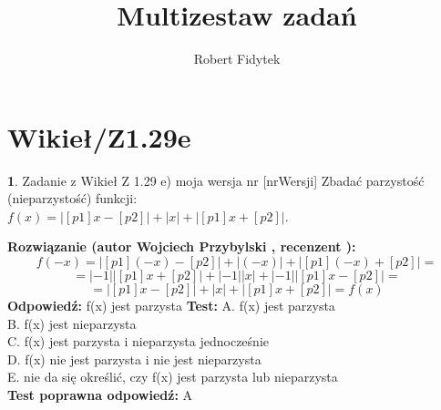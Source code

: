 \documentclass[12pt, a4paper]{article}
\title{Multizestaw zadań}
\author{Robert Fidytek}
\date{}
\theoremstyle{definition} %
\newtheorem{zad}{}
\newcommand{\kategoria}[1]{\section{#1}} %
\newcommand{\zadStart}[1]{\begin{zad}#1\newline} %
\newcommand{\zadStop}{\end{zad}}   %
\newcommand{\rozwStart}[2]{\noindent \textbf{Rozwiązanie (autor #1 , recenzent #2): }\newline} %
\newcommand{\rozwStop}{\newline}                                            %
\newcommand{\odpStart}{\noindent \textbf{Odpowiedź:}\newline}    %
\newcommand{\odpStop}{\newline}                                             %
\newcommand{\testStart}{\noindent \textbf{Test:}\newline} %
\newcommand{\testStop}{\newline} %
\newcommand{\kluczStart}{\noindent \textbf{Test poprawna odpowiedź:}\newline} %
\newcommand{\kluczStop}{\newline} %
\begin{document}
\maketitle


\kategoria{Wikieł/Z1.29e}
\zadStart{Zadanie z Wikieł Z 1.29 e) moja wersja nr [nrWersji]}
Zbadać parzystość (nieparzystość) funkcji: \\$ f(x)=|[p1]x-[p2]|+|x|+|[p1]x+[p2]|$.
\zadStop
\rozwStart{Wojciech Przybylski}{}
$$f(-x)=|[p1](-x)-[p2]|+|(-x)|+|[p1](-x)+[p2]|=$$
$$=|-1||[p1]x+[p2]|+|-1||x|+|-1||[p1]x-[p2]|=$$
$$=|[p1]x-[p2]|+|x|+|[p1]x+[p2]|=f(x)$$
\rozwStop
\odpStart
f(x) jest parzysta
\odpStop
\testStart
A. f(x) jest parzysta\\
B. f(x) jest nieparzysta\\
C. f(x) jest parzysta i nieparzysta jednocześnie\\
D. f(x) nie jest parzysta i nie jest nieparzysta\\
E. nie da się określić, czy f(x) jest parzysta lub nieparzysta\\
\testStop
\kluczStart
A
\kluczStop
\end{document}
